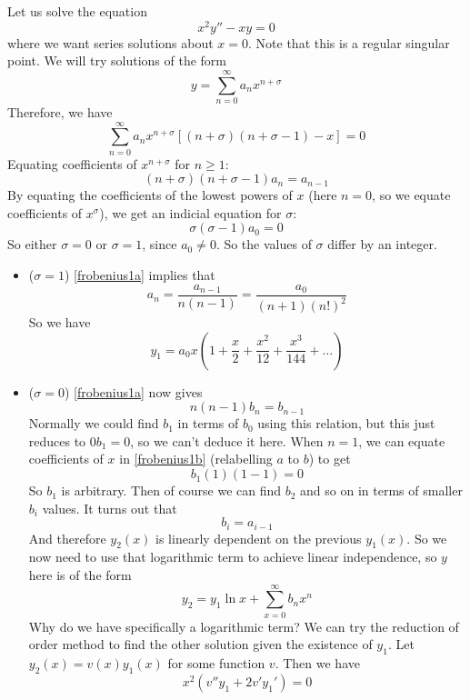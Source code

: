 \begin{example}
	Let us solve the equation
	\begin{equation}\label{frobenius1}
		x^2y'' - xy = 0
	\end{equation}
	where we want series solutions about \(x=0\).
	Note that this is a regular singular point.
	We will try solutions of the form
	\[
		y=\sum_{n=0}^\infty a_n x^{n+\sigma}
	\]
	Therefore, we have
	\begin{equation}\label{frobenius1b}
		\sum_{n=0}^\infty a_n x^{n+\sigma}\left[ (n+\sigma)(n+\sigma - 1) - x \right] = 0
	\end{equation}
	Equating coefficients of \(x^{n+\sigma}\) for \(n \geq 1\):
	\begin{equation}\label{frobenius1a}
		(n+\sigma)(n+\sigma-1) a_n = a_{n-1}
	\end{equation}
	By equating the coefficients of the lowest powers of \(x\) (here \(n=0\), so we equate coefficients of \(x^\sigma\)), we get an indicial equation for \(\sigma\):
	\[
		\sigma(\sigma - 1)a_0 = 0
	\]
	So either \(\sigma = 0\) or \(\sigma = 1\), since \(a_0 \neq 0\).
	So the values of \(\sigma\) differ by an integer.
	\begin{itemize}
		\item (\(\sigma = 1\)) \eqref{frobenius1a} implies that
			\[
				a_n = \frac{a_{n-1}}{n(n-1)} = \frac{a_0}{(n+1)(n!)^2}
			\]
			So we have
			\[
				y_1 = a_0x\left(1 + \frac{x}{2} + \frac{x^2}{12} + \frac{x^3}{144} + \dots\right)
			\]
		\item (\(\sigma = 0\)) \eqref{frobenius1a} now gives
			\[
				n(n-1)b_n = b_{n-1}
			\]
			Normally we could find \(b_1\) in terms of \(b_0\) using this relation, but this just reduces to \(0b_1 = 0\), so we can't deduce it here.
			When \(n=1\), we can equate coefficients of \(x\) in \eqref{frobenius1b} (relabelling \(a\) to \(b\)) to get
			\[
				b_1 (1)(1-1) = 0
			\]
			So \(b_1\) is arbitrary.
			Then of course we can find \(b_2\) and so on in terms of smaller \(b_i\) values.
			It turns out that
			\[
				b_i = a_{i-1}
			\]
			And therefore \(y_2(x)\) is linearly dependent on the previous \(y_1(x)\).
			So we now need to use that logarithmic term to achieve linear independence, so \(y\) here is of the form
			\[
				y_2 = y_1\ln x + \sum_{x=0}^\infty b_n x^n
			\]
			Why do we have specifically a logarithmic term?
			We can try the reduction of order method to find the other solution given the existence of \(y_1\).
			Let \(y_2(x) = v(x)y_1(x)\) for some function \(v\).
			Then we have
			\[
				x^2(v''y_1 + 2v'y_1') = 0
\]
\end{itemize}
\end{example}
